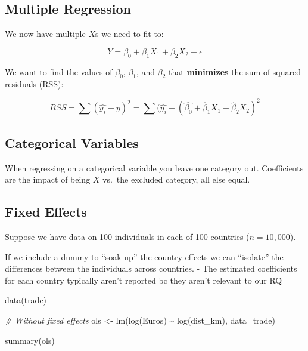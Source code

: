 \documentclass[
]{article}
\newenvironment{Shaded}{\begin{snugshade}}{\end{snugshade}}
\newcommand{\AttributeTok}[1]{\textcolor[rgb]{0.77,0.63,0.00}{#1}}
\newcommand{\CommentTok}[1]{\textcolor[rgb]{0.56,0.35,0.01}{\textit{#1}}}
\newcommand{\FunctionTok}[1]{\textcolor[rgb]{0.00,0.00,0.00}{#1}}
\newcommand{\NormalTok}[1]{#1}
\newcommand{\OtherTok}[1]{\textcolor[rgb]{0.56,0.35,0.01}{#1}}
\newcommand{\SpecialCharTok}[1]{\textcolor[rgb]{0.00,0.00,0.00}{#1}}
\begin{document}
\hypertarget{multiple-regression}{%
\subsection{Multiple Regression}\label{multiple-regression}}

We now have multiple \(X\)s we need to fit to:

\[Y=\beta_0+\beta_1X_1+\beta_2X_2+\epsilon\]

We want to find the values of \(\beta_0\), \(\beta_1\), and \(\beta_2\)
that \textbf{minimizes} the sum of squared residuals (RSS):

\[RSS=\sum(\hat{y_i}-\bar{y})^2=\sum(\hat{y_i}-(\hat{\beta_0}+\hat\beta_1X_1+\hat\beta_2X_2)^2\]

\hypertarget{categorical-variables}{%
\subsection{Categorical Variables}\label{categorical-variables}}

When regressing on a categorical variable you leave one category out.
Coefficients are the impact of being \(X\) vs.~the excluded category,
all else equal.

\hypertarget{fixed-effects}{%
\subsection{Fixed Effects}\label{fixed-effects}}

Suppose we have data on 100 individuals in each of 100 countries
(\(n=10,000\)).

If we include a dummy to ``soak up'' the country effects we can
``isolate'' the differences between the individuals across countries. -
The estimated coefficients for each country typically aren't reported bc
they aren't relevant to our RQ

\begin{Shaded}
\begin{Highlighting}[]
\FunctionTok{data}\NormalTok{(trade)}

\CommentTok{\# Without fixed effects}
\NormalTok{ols }\OtherTok{\textless{}{-}} \FunctionTok{lm}\NormalTok{(}\FunctionTok{log}\NormalTok{(Euros) }\SpecialCharTok{\textasciitilde{}} \FunctionTok{log}\NormalTok{(dist\_km), }\AttributeTok{data=}\NormalTok{trade)}

\FunctionTok{summary}\NormalTok{(ols)}
\end{Highlighting}
\end{Shaded}
\end{document}
